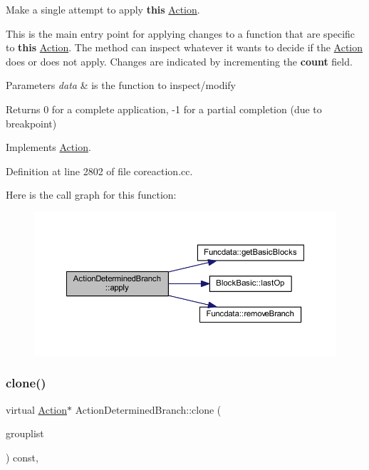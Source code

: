 Make a single attempt to apply {\bfseries{this}} \mbox{\hyperlink{class_action}{Action}}. 

This is the main entry point for applying changes to a function that are specific to {\bfseries{this}} \mbox{\hyperlink{class_action}{Action}}. The method can inspect whatever it wants to decide if the \mbox{\hyperlink{class_action}{Action}} does or does not apply. Changes are indicated by incrementing the {\bfseries{count}} field. 
\begin{DoxyParams}{Parameters}
{\em data} & is the function to inspect/modify \\
\hline
\end{DoxyParams}
\begin{DoxyReturn}{Returns}
0 for a complete application, -\/1 for a partial completion (due to breakpoint) 
\end{DoxyReturn}


Implements \mbox{\hyperlink{class_action_aac1c3999d6c685b15f5d9765a4d04173}{Action}}.



Definition at line 2802 of file coreaction.\+cc.

Here is the call graph for this function\+:
\nopagebreak
\begin{figure}[H]
\begin{center}
\leavevmode
\includegraphics[width=350pt]{class_action_determined_branch_ade1a39edabc809aa136ef4f109d46560_cgraph}
\end{center}
\end{figure}
\mbox{\label{class_action_determined_branch_a41b8b77cfb5f57c0639009ead3c25ee9}} 
\subsubsection{\texorpdfstring{clone()}{clone()}}
{\footnotesize\ttfamily virtual \mbox{\hyperlink{class_action}{Action}}$\ast$ Action\+Determined\+Branch\+::clone (\begin{DoxyParamCaption}\item[{const \mbox{\hyperlink{class_action_group_list}{Action\+Group\+List}} \&}]{grouplist }\end{DoxyParamCaption}) const\hspace{0.3cm}{\ttfamily [inline]}, {\ttfamily [virtual]}}




